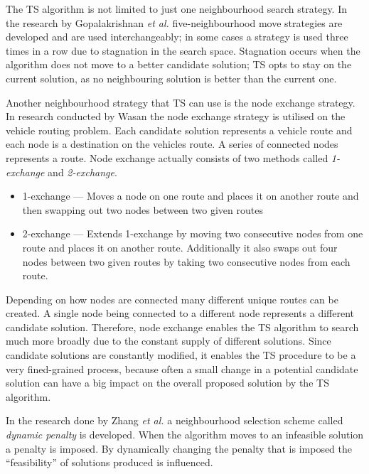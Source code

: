 The \gls{TS} algorithm is not limited to just one neighbourhood search strategy. In the research by Gopalakrishnan \emph{et al.}\cite{TabuCarryOver} five-neighbourhood move strategies are developed and are used interchangeably; in some cases a strategy is used three times in a row due to stagnation in the search space. Stagnation occurs when the algorithm does not move to a better candidate solution; \gls{TS} opts to stay on the current solution, as no neighbouring solution is better than the current one. 

Another neighbourhood strategy that \gls{TS} can use is the node exchange strategy. In research conducted by Wasan the node exchange strategy is utilised on the vehicle routing problem. Each candidate solution represents a vehicle route and each node is a destination on the vehicles route. A series of connected nodes represents a route. Node exchange actually consists of two methods called \emph{1-exchange} and \emph{2-exchange}\cite{ReactiveTabuVHR}.
\begin{itemize}
\item{1-exchange} --- Moves a node on one route and places it on another route and then swapping out two nodes between two given routes\cite{ReactiveTabuVHR}
\item{2-exchange} --- Extends 1-exchange by moving two consecutive nodes from one route and places it on another route. Additionally it also swaps out four nodes between two given routes by taking two consecutive nodes from each route\cite{ReactiveTabuVHR}.
\end{itemize}

Depending on how nodes are connected many different unique routes can be created. A single node being connected to a different node represents a different candidate solution. Therefore, node exchange enables the \gls{TS} algorithm to search much more broadly due to the constant supply of different solutions. Since candidate solutions are constantly modified, it enables the \gls{TS} procedure to be a very fined-grained process, because often a small change in a potential candidate solution can have a big impact on the overall proposed solution by the \gls{TS} algorithm.

In the research done by Zhang \emph{et al.}\cite{TSHazardous} a neighbourhood selection scheme called \emph{dynamic penalty} is developed. When the algorithm moves to an infeasible solution a penalty is imposed. By dynamically changing the penalty that is imposed the ``feasibility'' of solutions produced is influenced. 

